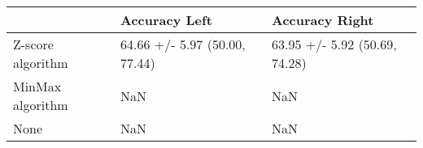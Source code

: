 \begin{tabular}{lll}
\toprule
{} &                  Accuracy Left &                 Accuracy Right \\
\midrule
Z-score algorithm &  64.66 +/- 5.97 (50.00, 77.44) &  63.95 +/- 5.92 (50.69, 74.28) \\
MinMax algorithm  &                            NaN &                            NaN \\
None              &                            NaN &                            NaN \\
\bottomrule
\end{tabular}
